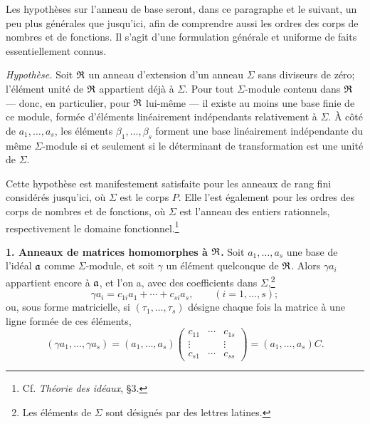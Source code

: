 Les hypothèses sur l'anneau de base seront, dans ce paragraphe et le suivant, un peu plus générales que jusqu'ici, afin de comprendre aussi les ordres des corps de nombres et de fonctions. Il s'agit d'une formulation générale et uniforme de faits essentiellement connus.

\emph{Hypothèse.} Soit $\mathfrak R$ un anneau d'extension d'un anneau $\Sigma$ sans diviseurs de zéro; l'élément unité de $\mathfrak R$ appartient déjà à $\Sigma$. Pour tout $\Sigma$-module contenu dans $\mathfrak R$ --- donc, en particulier, pour $\mathfrak R$ lui-même --- il existe au moins une base finie de ce module, formée d'éléments linéairement indépendants relativement à $\Sigma$. À côté de $a_1,\ldots,a_s$, les éléments $\beta_1,\ldots,\beta_s$ forment une base linéairement indépendante du même $\Sigma$-module si et seulement si le déterminant de transformation est une unité de $\Sigma$.

Cette hypothèse est manifestement satisfaite pour les anneaux de rang fini considérés jusqu'ici, où $\Sigma$ est le corps $P$. Elle l'est également pour les ordres des corps de nombres et de fonctions, où $\Sigma$ est l'anneau des entiers rationnels, respectivement le domaine fonctionnel.\footnote{Cf. \emph{Théorie des idéaux}, \S 3.}

\textbf{1. Anneaux de matrices homomorphes à $\mathfrak R$.} Soit $a_1,\ldots,a_s$ une base de l'idéal $\mathfrak a$ comme $\Sigma$-module, et soit $\gamma$ un élément quelconque de $\mathfrak R$. Alors $\gamma a_i$ appartient encore à $\mathfrak a$, et l'on a, avec des coefficients dans $\Sigma$,\footnote{Les éléments de $\Sigma$ sont désignés par des lettres latines.}
\[
\gamma a_i=c_{1i}a_1+\cdots+c_{si}a_s,
\qquad (i=1,\ldots,s);
\]
ou, sous forme matricielle, si $(\tau_1,\ldots,\tau_s)$ désigne chaque fois la matrice à une ligne formée de ces éléments,
\[
(\gamma a_1,\ldots,\gamma a_s)
=(a_1,\ldots,a_s)
\begin{pmatrix}
 c_{11}&\cdots&c_{1s}\\
 \vdots&&\vdots\\
 c_{s1}&\cdots&c_{ss}
\end{pmatrix}
=(a_1,\ldots,a_s)C.
\]

